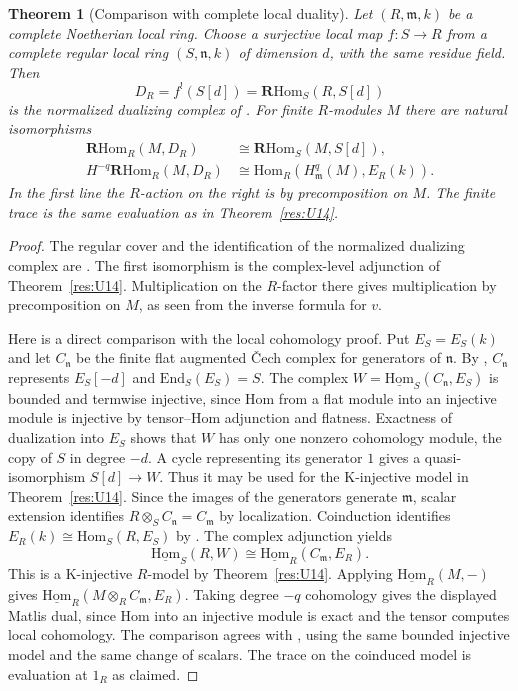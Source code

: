 \documentclass[11pt,oneside,openany]{book}
\newtheorem{theorem}{Theorem}[chapter]
\theoremstyle{definition}
\theoremstyle{remark}
\begin{document}
\begin{theorem}[Comparison with complete local duality]\label{res:U19}
Let \((R,\mathfrak m,k)\) be a complete Noetherian local ring.
Choose a surjective local map \(f:S\to R\) from a complete
regular local ring \((S,\mathfrak n,k)\) of dimension \(d\),
with the same residue field. Then
\[
 D_R=f^!(S[d])=\mathbf R\mathrm{Hom}_S(R,S[d])
\]
is the normalized dualizing complex of
\cite[D05]{ca-topics}. For finite \(R\)-modules \(M\)
there are natural isomorphisms
\[
 \begin{split}
 \mathbf R\mathrm{Hom}_R(M,D_R)
      &\cong \mathbf R\mathrm{Hom}_S(M,S[d]),\\
 H^{-q}\mathbf R\mathrm{Hom}_R(M,D_R)
      &\cong \mathrm{Hom}_R(H^q_{\mathfrak m}(M),E_R(k)).
 \end{split}
\]
In the first line the \(R\)-action on the right is by
precomposition on \(M\). The finite trace is the same
evaluation as in Theorem~\ref{res:U14}.
\end{theorem}
\begin{proof}
The regular cover and the identification of the normalized
dualizing complex are \cite[C04, D05]{ca-topics}.
The first isomorphism is the complex-level adjunction of
Theorem~\ref{res:U14}. Multiplication on the \(R\)-factor
there gives multiplication by precomposition on \(M\),
as seen from the inverse formula for \(v\).

Here is a direct comparison with the local cohomology
proof. Put \(E_S=E_S(k)\) and let \(C_{\mathfrak n}\)
be the finite flat augmented \v{C}ech complex for
generators of \(\mathfrak n\). By
\cite[L05, D01, M03]{ca-topics}, \(C_{\mathfrak n}\)
represents \(E_S[-d]\) and
\(\mathrm{End}_S(E_S)=S\).
The complex \(W=\underline{\mathrm{Hom}}_S(C_{\mathfrak n},E_S)\)
is bounded and termwise injective, since Hom from a flat
module into an injective module is injective by tensor--Hom
adjunction and flatness. Exactness of dualization into
\(E_S\) shows that \(W\) has only one nonzero cohomology
module, the copy of \(S\) in degree \(-d\). A cycle representing
its generator \(1\) gives a quasi-isomorphism \(S[d]\to W\).
Thus it may be used for the K-injective model in
Theorem~\ref{res:U14}. Since the images of the generators
generate \(\mathfrak m\), scalar extension identifies
\(R\otimes_S C_{\mathfrak n}=C_{\mathfrak m}\)
by localization. Coinduction identifies
\(E_R(k)\cong\mathrm{Hom}_S(R,E_S)\) by
\cite[D04]{ca-topics}. The complex adjunction yields
\[
 \underline{\mathrm{Hom}}_S(R,W)
    \cong \underline{\mathrm{Hom}}_R(C_{\mathfrak m},E_R).
\]
This is a K-injective \(R\)-model by Theorem~\ref{res:U14}.
Applying \(\underline{\mathrm{Hom}}_R(M,-)\) gives
\(\underline{\mathrm{Hom}}_R(M\otimes_R C_{\mathfrak m},E_R)\).
Taking degree \(-q\) cohomology gives the displayed Matlis
dual, since Hom into an injective module is exact and the
tensor computes local cohomology. The comparison agrees
with \cite[D06]{ca-topics}, using the same bounded
injective model and the same change of scalars. The trace
on the coinduced model is evaluation at \(1_R\) as claimed.
\end{proof}
\end{document}
